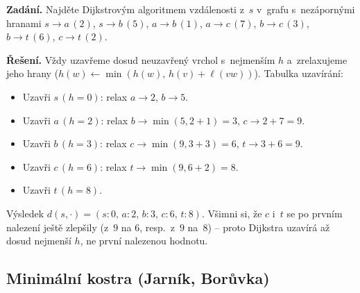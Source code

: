 \documentclass[11pt,a4paper]{article}
\begin{document}
\begin{priklad}
\textbf{Zadání.} Najděte Dijkstrovým algoritmem vzdálenosti z~$s$ v~grafu s~nezápornými hranami $s\!\to\!a\,(2)$, $s\!\to\!b\,(5)$, $a\!\to\!b\,(1)$, $a\!\to\!c\,(7)$, $b\!\to\!c\,(3)$, $b\!\to\!t\,(6)$, $c\!\to\!t\,(2)$.\par
\textbf{Řešení.} Vždy uzavřeme dosud neuzavřený vrchol s~nejmenším $h$ a~zrelaxujeme jeho hrany ($h(w)\leftarrow\min(h(w),\,h(v)+\ell(vw))$). Tabulka uzavírání:
\begin{itemize}
  \item Uzavři $s\,(h{=}0)$: relax $a\!\to\!2$, $b\!\to\!5$.
  \item Uzavři $a\,(h{=}2)$: relax $b\!\to\!\min(5,2{+}1){=}3$, $c\!\to\!2{+}7{=}9$.
  \item Uzavři $b\,(h{=}3)$: relax $c\!\to\!\min(9,3{+}3){=}6$, $t\!\to\!3{+}6{=}9$.
  \item Uzavři $c\,(h{=}6)$: relax $t\!\to\!\min(9,6{+}2){=}8$.
  \item Uzavři $t\,(h{=}8)$.
\end{itemize}
Výsledek $\boxed{d(s,\cdot)=(s{:}0,\,a{:}2,\,b{:}3,\,c{:}6,\,t{:}8)}$. Všimni si, že $c$ i~$t$ se po prvním nalezení ještě zlepšily (z~$9$ na $6$, resp.\ z~$9$ na~$8$) -- proto Dijkstra uzavírá až dosud nejmenší $h$, ne první nalezenou hodnotu.

\begin{center}
\end{center}
\end{priklad}

\subsection{Minimální kostra (Jarník, Borůvka)}
\end{document}
